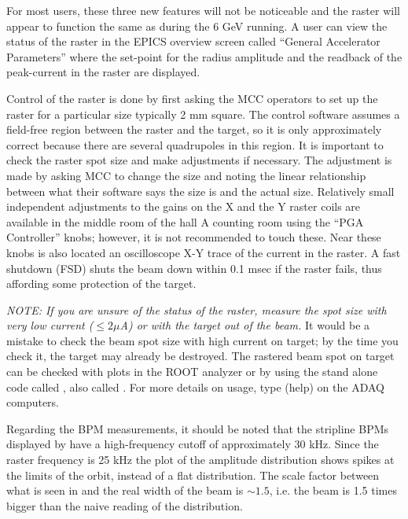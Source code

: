 For most users, these three new features will not be
noticeable and the raster will appear to function
the same as during the 6 GeV running.
A user can view the 
status of the raster in the
EPICS overview screen called ``General Accelerator
Parameters'' where the set-point for the radius amplitude
and the readback of the peak-current in the raster are displayed.

Control of the raster is done by first asking the MCC
operators to set up the raster for a particular size
typically 2 mm square.
The control software assumes a field-free region between
the raster and the target, so it is only approximately
correct because there are several quadrupoles in this region.
It is important to check the raster spot size and
make adjustments if necessary.  The adjustment is made
by asking MCC to change the size and noting the 
linear relationship between what their software says
the size is and the actual size.
Relatively small independent adjustments to the 
gains on the X and the Y raster
coils are available in the middle room of the hall A
counting room using the ``PGA Controller'' knobs;
however, it is not recommended to touch these.
Near these knobs is also located an oscilloscope X-Y trace
of the current in the raster.  A fast shutdown (FSD) shuts
the beam down within 0.1 msec if the raster fails, thus
affording some protection of the target.

{\it NOTE:  If you are unsure of the status of the raster,
measure the spot size with very low current ($\le 2 \mu$A) or with
the target out of the beam.}  It would be a mistake
to check the beam spot size with high current on target; by
the time you check it, the target may already be destroyed.
The rastered beam spot on target can be checked with
plots in the ROOT analyzer or by 
using the stand alone code called ,
also called .
For more details on usage, type  (help)
on the ADAQ computers.

Regarding the BPM measurements, it should be noted that 
the stripline BPMs displayed by  have a high-frequency 
cutoff of approximately 30 kHz.  Since the raster frequency is 25 kHz
the plot of the amplitude distribution shows spikes at the 
limits of the orbit, instead of a flat distribution.  The scale
factor between what is seen in  and the real width of the beam
is $\sim 1.5$, i.e. the beam is 1.5 times bigger than the naive
reading of the  distribution.


